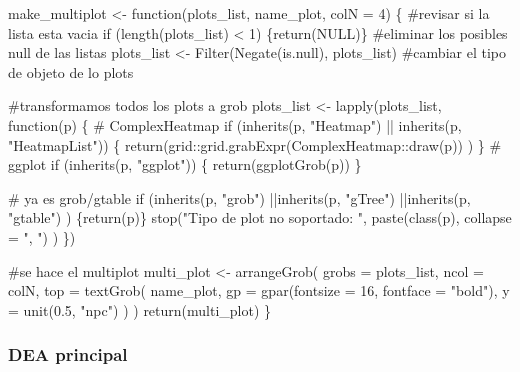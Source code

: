 \documentclass[
  9pt,
]{article}
\newenvironment{Shaded}{\begin{snugshade}}{\end{snugshade}}
\newcommand{\NormalTok}[1]{\textcolor[rgb]{0.00,0.23,0.31}{#1}}
\begin{document}
\begin{Shaded}
\begin{Highlighting}[]

\NormalTok{make\_multiplot \textless{}{-} function(plots\_list, name\_plot, colN = 4) \{}
\NormalTok{  \#revisar si la lista esta vacia}
\NormalTok{  if (length(plots\_list) \textless{} 1) \{return(NULL)\}}
\NormalTok{  \#eliminar los posibles null de las listas}
\NormalTok{  plots\_list \textless{}{-} Filter(Negate(is.null), plots\_list)}
\NormalTok{  \#cambiar el tipo de objeto de lo plots}

\NormalTok{  \#transformamos todos los plots a grob}
\NormalTok{  plots\_list \textless{}{-} lapply(plots\_list, function(p) \{}
\NormalTok{    \# ComplexHeatmap}
\NormalTok{    if (inherits(p, "Heatmap") || inherits(p, "HeatmapList")) \{}
\NormalTok{      return(grid::grid.grabExpr(ComplexHeatmap::draw(p))}
\NormalTok{      )}
\NormalTok{    \}}
\NormalTok{    \# ggplot}
\NormalTok{    if (inherits(p, "ggplot")) \{}
\NormalTok{      return(ggplotGrob(p))}
\NormalTok{    \}}

\NormalTok{    \# ya es grob/gtable}
\NormalTok{    if (inherits(p, "grob") ||inherits(p, "gTree") ||inherits(p, "gtable")}
\NormalTok{    ) \{return(p)\}}
\NormalTok{    stop("Tipo de plot no soportado: ",}
\NormalTok{      paste(class(p), collapse = ", ")}
\NormalTok{    )}
\NormalTok{  \})}

\NormalTok{  \#se hace el multiplot}
\NormalTok{  multi\_plot \textless{}{-} arrangeGrob(}
\NormalTok{    grobs = plots\_list,}
\NormalTok{    ncol = colN,}
\NormalTok{    top = textGrob(}
\NormalTok{      name\_plot,}
\NormalTok{      gp = gpar(fontsize = 16, fontface = "bold"),}
\NormalTok{      y = unit(0.5, "npc")}
\NormalTok{    )}
\NormalTok{  )}
\NormalTok{  return(multi\_plot)}
\NormalTok{\}}
\end{Highlighting}
\end{Shaded}

\subsubsection{DEA principal}\label{DEA_prin}
\end{document}
